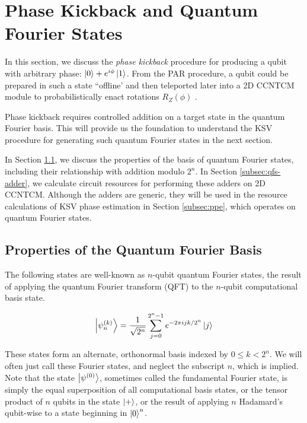 \section{Phase Kickback and Quantum Fourier States}
\label{sec:qcompile-qfs}

In this section, we discuss the \emph{phase kickback} procedure for
producing a qubit with arbitrary phase: $\left\vert{0}\right\rangle + e^{i\phi}\left\vert{1}\right\rangle$.
From the PAR procedure, a qubit could be prepared in such a state
``offline' and then teleported later into a \textsf{2D CCNTCM} module to
probabilistically enact rotations $R_Z(\phi)$ \cite{Jones2012}.

Phase kickback requires controlled addition on a target state in 
the quantum Fourier basis. This will provide us the foundation
to understand the KSV procedure for generating such quantum Fourier
states in the next section.

In Section \ref{subsec:qfs-basis}, we discuss the properties of the
basis of quantum Fourier states, including their relationship with
addition modulo $2^n$. In Section \ref{subsec:qfs-adder},
we calculate circuit resources for performing these adders
on \textsf{2D CCNTCM}. Although the adders are generic, they will be
used in the resource calculations of KSV phase estimation in
Section \ref{subsec:ppe}, which operates on quantum Fourier states.

\subsection{Properties of the Quantum Fourier Basis}
\label{subsec:qfs-basis}

The following states are well-known as $n$-qubit quantum Fourier states,
the result of applying the quantum Fourier transform (QFT)
to the $n$-qubit computational basis state. 

\begin{equation}
\left\vert{\psi^{(k)}_{n}}\right\rangle = \frac{1}{\sqrt{2^n}} \sum_{j=0}^{2^n-1}
e^{-2\pi i j k / 2^n} \left\vert{j}\right\rangle
\end{equation}

These states form an alternate, orthonormal basis indexed by
$0 \le k < 2^n$. We will often just call these Fourier states,
and neglect the subscript $n$, which is implied.
Note that the state $\left\vert{\psi^{(0)}}\right\rangle$, sometimes
called the fundamental Fourier state, is simply the equal superposition
of all computational basis states, or the tensor product of
$n$ qubits in the state $\left\vert{+}\right\rangle$, or the result of applying
$n$ Hadamard's qubit-wise to a state beginning in $\left\vert{0}\right\rangle^n$.

